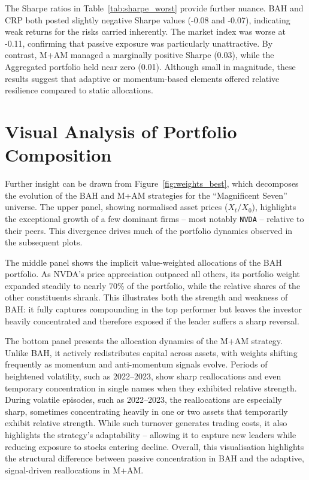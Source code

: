 \documentclass[12pt,a4paper]{report}
\begin{document}
The Sharpe ratios in Table~\ref{tab:sharpe_worst} provide further nuance. BAH and CRP both posted slightly negative Sharpe values (-0.08 and -0.07), indicating weak returns for the risks carried inherently. The market index was worse at -0.11, confirming that passive exposure was particularly unattractive. By contrast, M+AM managed a marginally positive Sharpe (0.03), while the Aggregated portfolio held near zero (0.01). Although small in magnitude, these results suggest that adaptive or momentum-based elements offered relative resilience compared to static allocations.  

\section{Visual Analysis of Portfolio Composition}

Further insight can be drawn from Figure~\ref{fig:weights_best}, which decomposes the evolution of the BAH and M+AM strategies for the ``Magnificent Seven'' universe. The upper panel, showing normalised asset prices ($X_t/X_0$), highlights the exceptional growth of a few dominant firms -- most notably \texttt{NVDA} -- relative to their peers. This divergence drives much of the portfolio dynamics observed in the subsequent plots. 

The middle panel shows the implicit value-weighted allocations of the BAH portfolio. As NVDA’s price appreciation outpaced all others, its portfolio weight expanded steadily to nearly 70\% of the portfolio, while the relative shares of the other constituents shrank. This illustrates both the strength and weakness of BAH: it fully captures compounding in the top performer but leaves the investor heavily concentrated and therefore exposed if the leader suffers a sharp reversal. 

The bottom panel presents the allocation dynamics of the M+AM strategy. Unlike BAH, it actively redistributes capital across assets, with weights shifting frequently as momentum and anti-momentum signals evolve. Periods of heightened volatility, such as 2022–2023, show sharp reallocations and even temporary concentration in single names when they exhibited relative strength. During volatile episodes, such as 2022–2023, the reallocations are especially sharp, sometimes concentrating heavily in one or two assets that temporarily exhibit relative strength. While such turnover generates trading costs, it also highlights the strategy’s adaptability -- allowing it to capture new leaders while reducing exposure to stocks entering decline. Overall, this visualisation highlights the structural difference between passive concentration in BAH and the adaptive, signal-driven reallocations in M+AM.
\end{document}
